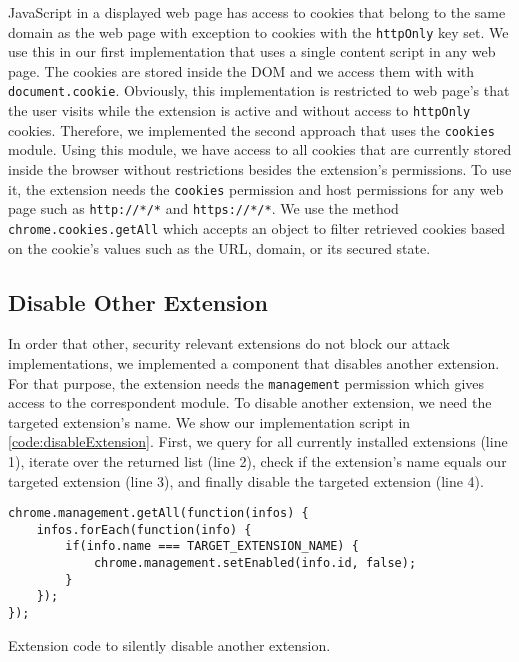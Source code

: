 	JavaScript in a displayed web page has access to cookies that belong to the same domain as the web page with exception to cookies with the \texttt{httpOnly} key set. We use this in our first implementation that uses a single content script in any web page. The cookies are stored inside the DOM and we access them with with \texttt{document.cookie}. Obviously, this implementation is restricted to web page's that the user visits while the extension is active and without access to \texttt{httpOnly} cookies. Therefore, we implemented the second approach that uses the \texttt{cookies} module. Using this module, we have access to all cookies that are currently stored inside the browser without restrictions besides the extension's permissions. To use it, the extension needs the \texttt{cookies} permission and host permissions for any web page such as \texttt{http://*/*} and \texttt{https://*/*}. We use the method \texttt{chrome.cookies.getAll} which accepts an object to filter retrieved cookies based on the cookie's values such as the URL, domain, or its secured state.
 

\subsection{Disable Other Extension}

	In order that other, security relevant extensions do not block our attack implementations, we implemented a component that disables another extension. For that purpose, the extension needs the \texttt{management} permission which gives access to the correspondent module. To disable another extension, we need the targeted extension's name. We show our implementation script in \autoref{code:disableExtension}. First, we query for all currently installed extensions (line 1), iterate over the returned list (line 2), check if the extension's name equals our targeted extension (line 3), and finally disable the targeted extension (line 4). 

	\begin{code}
		\begin{lstlisting}
chrome.management.getAll(function(infos) {
	infos.forEach(function(info) {
		if(info.name === TARGET_EXTENSION_NAME) {
			chrome.management.setEnabled(info.id, false);
		}
	});
});
\end{lstlisting}
		\caption{Extension code to silently disable another extension.}
		\label{code:disableExtension}
	\end{code}



